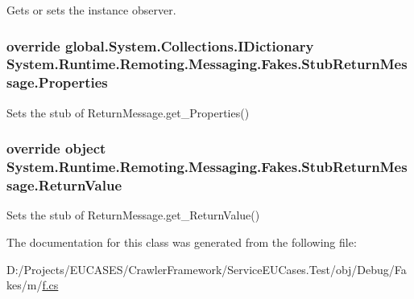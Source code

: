 Gets or sets the instance observer.

\hypertarget{class_system_1_1_runtime_1_1_remoting_1_1_messaging_1_1_fakes_1_1_stub_return_message_a26ffcd468af69b92c233f249f57542d5}{
\subsubsection[{Properties}]{\setlength{\rightskip}{0pt plus 5cm}override global.\-System.\-Collections.\-I\-Dictionary System.\-Runtime.\-Remoting.\-Messaging.\-Fakes.\-Stub\-Return\-Message.\-Properties\hspace{0.3cm}{\ttfamily [get]}}}\label{class_system_1_1_runtime_1_1_remoting_1_1_messaging_1_1_fakes_1_1_stub_return_message_a26ffcd468af69b92c233f249f57542d5}


Sets the stub of Return\-Message.\-get\-\_\-\-Properties()

\hypertarget{class_system_1_1_runtime_1_1_remoting_1_1_messaging_1_1_fakes_1_1_stub_return_message_a408966dfe5890d12762e98d69df138b6}{
\subsubsection[{Return\-Value}]{\setlength{\rightskip}{0pt plus 5cm}override object System.\-Runtime.\-Remoting.\-Messaging.\-Fakes.\-Stub\-Return\-Message.\-Return\-Value\hspace{0.3cm}{\ttfamily [get]}}}\label{class_system_1_1_runtime_1_1_remoting_1_1_messaging_1_1_fakes_1_1_stub_return_message_a408966dfe5890d12762e98d69df138b6}


Sets the stub of Return\-Message.\-get\-\_\-\-Return\-Value()



The documentation for this class was generated from the following file\-:\begin{DoxyCompactItemize}
\item 
D\-:/\-Projects/\-E\-U\-C\-A\-S\-E\-S/\-Crawler\-Framework/\-Service\-E\-U\-Cases.\-Test/obj/\-Debug/\-Fakes/m/\hyperlink{m_2f_8cs}{f.\-cs}\end{DoxyCompactItemize}

